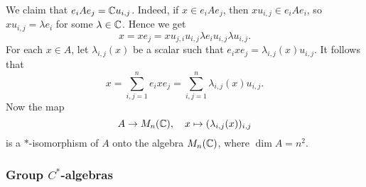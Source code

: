 \begin{myproof}
  We claim that $e_i A e_j = \mathbb {C} u_{i, j}$. Indeed, if $x \in e_i A e_j$, then 
  $x u_{i, j} \in e_i A e_i$, so $x u_{i, j} = \lambda e_i$ for some $\lambda \in \mathbb {C}$. Hence we get 
  $$x = x e_j = x u_{j, i} u _{i, j} \lambda e_i u_{i, j} \lambda u_{i, j}.$$
  For each $x \in A$, let $\lambda_{i, j} (x)$ be a scalar such that $e_i x e_j = \lambda_{i, j} (x) u_{i, j}$.
  It follows that 
  $$x = \sum_{i, j = 1} ^n e_i x e_j = \sum_{i, j = 1} ^n \lambda_{i, j} (x) u_{i, j}.$$
  Now the map $$A \to M_n (\mathbb {C}) ,\quad x \mapsto (\lambda_{i, j} (x))_{i, j}$$
  is a $*$-isomorphism of $A$ onto the algebra $M_n (\mathbb {C})$, where $\dim A = n^2$.
\end{myproof}

\begin{comment}
\begin{myproof}[Proof using Artin-Wedderburn theorem for semisimple algebras]
  Since $A$ is a finite-dimensional algebra over $\C$, it is artinian. It is enough to prove that it is $J$-semisimple, meaning $\rad A = (0)$.
  Denote $J = \rad A$, which is finitely-generated.
  By the artinian property, the sequence 
  $$J \supseteq J^2 \supseteq J^3 \supseteq \dots$$
  has to stabilize somewhere, so assume $J^n = J^{n + 1}$.
  By Nakayama's lemma, we have $J \cdot J^{n} = J^n$, which implies $J^n = (0)$, so $J$ is nilpotent.
  Take any $a \in J$. Then $a^* a \in J$ and so $(a^* a)^n = 0$. Then we have 
  \begin{align*}
    0 = \| (a^* a)^{2^n} \| = \| a^* a\|^{2^n} = \| a\|^{2^{n + 1}}
  \end{align*}
  and $a = 0$. So $A$ is artinian and $J$-semisimple, therefore semisimple. Now we use Artin-Wedderburn for algebras,
  together with the fact that $\C$ is an algebraically-closed field, so any finite-dimensional division algebra over $\C$ is $\C$ itself.
\end{myproof}

\end{comment}

\subsubsection{Group $C^*$-algebras}

